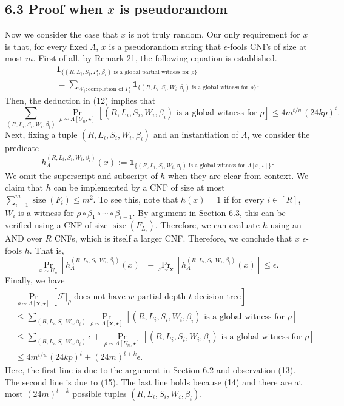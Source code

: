 \documentclass[10pt,a4paper]{article}
\begin{document}
\subsection*{6.3 Proof when $x$ is pseudorandom}
Now we consider the case that $x$ is not truly random. Our only requirement for $x$ is that, for every fixed $\Lambda$, $x$ is a pseudorandom string that $\epsilon$-fools CNFs of size at most $m$. First of all, by Remark 21, the following equation is established.
\begin{multline*}\mathbf1_{\{(R,L_i,S_i,P_i,\beta_i)\text{ is a global partial witness for }\rho\}}\\=\sum_{W_i:\text{completion of }P_i}\mathbf1_{\{(R,L_i,S_i,W_i,\beta_i)\text{ is a global witness for }\rho\}}.\tag{13}\end{multline*}
Then, the deduction in (12) implies that
\[\sum_{(R,L_i,S_i,W_i,\beta_i)}\Pr_{\rho\sim\Lambda[U_n,\star]}[(R,L_i,S_i,W_i,\beta_i)\text{ is a global witness for }\rho]\le4m^{t/w}(24kp)^t.\tag{14}\]
Next, fixing a tuple $(R,L_i,S_i,W_i,\beta_i)$ and an instantiation of $\Lambda$, we consider the predicate
\[h_\Lambda^{(R,L_i,S_i,W_i,\beta_i)}(x):=\mathbf1_{\{(R,L_i,S_i,W_i,\beta_i)\text{ is a global witness for }\Lambda[x,\star]\}}.\]
We omit the superscript and subscript of $h$ when they are clear from context. We claim that $h$ can be implemented by a CNF of size at most $\sum_{i=1}^m\operatorname{size}(F_i)\le m^2$. To see this, note that $h(x)=1$ if for every $i\in[R]$, $W_i$ is a witness for $\rho\circ\beta_1\circ\cdots\circ\beta_{i-1}$. By argument in Section 6.3, this can be verified using a CNF of size $\operatorname{size}(F_{L_i})$. Therefore, we can evaluate $h$ using an AND over $R$ CNFs, which is itself a larger CNF. Therefore, we conclude that $x$ $\epsilon$-fools $h$. That is,
\[\Pr_{x\sim U_n}[h_\Lambda^{(R,L_i,S_i,W_i,\beta_i)}(x)]-\Pr_{x\sim\boldsymbol x}[h_\Lambda^{(R,L_i,S_i,W_i,\beta_i)}(x)]\le\epsilon.\tag{15}\]
Finally, we have
\begin{align*}&\Pr_{\rho\sim\Lambda[\boldsymbol x,\star]}[\mathcal F|_\rho\text{ does not have }w\text{-partial depth-}t\text{ decision tree}]\\&\le\sum_{(R,L_i,S_i,W_i,\beta_i)}\Pr_{\rho\sim\Lambda[\boldsymbol x,\star]}[(R,L_i,S_i,W_i,\beta_i)\text{ is a global witness for }\rho]\\&\le\sum_{(R,L_i,S_i,W_i,\beta_i)}\epsilon+\Pr_{\rho\sim\Lambda[U_n,\star]}[(R,L_i,S_i,W_i,\beta_i)\text{ is a global witness for }\rho]\\&\le4m^{t/w}(24kp)^t+(24m)^{t+k}\epsilon.\end{align*}
Here, the first line is due to the argument in Section 6.2 and observation (13). The second line is due to (15). The last line holds because (14) and there are at most $(24m)^{t+k}$ possible tuples $(R,L_i,S_i,W_i,\beta_i)$.
\end{document}
